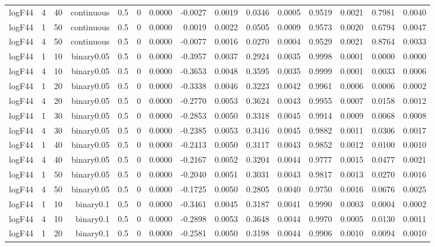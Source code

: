 \begin{longtable}{rrrrrrrrrrrrrrr}
  logF44 & 4 & 40 & continuous & 0.5 & 0 & 0.0000 & -0.0027 & 0.0019 & 0.0346 & 0.0005 & 0.9519 & 0.0021 & 0.7981 & 0.0040 \\ 
  logF44 & 1 & 50 & continuous & 0.5 & 0 & 0.0000 & 0.0019 & 0.0022 & 0.0505 & 0.0009 & 0.9573 & 0.0020 & 0.6794 & 0.0047 \\ 
  logF44 & 4 & 50 & continuous & 0.5 & 0 & 0.0000 & -0.0077 & 0.0016 & 0.0270 & 0.0004 & 0.9529 & 0.0021 & 0.8764 & 0.0033 \\ 
  logF44 & 1 & 10 & binary0.05 & 0.5 & 0 & 0.0000 & -0.3957 & 0.0037 & 0.2924 & 0.0035 & 0.9998 & 0.0001 & 0.0000 & 0.0000 \\ 
  logF44 & 4 & 10 & binary0.05 & 0.5 & 0 & 0.0000 & -0.3653 & 0.0048 & 0.3595 & 0.0035 & 0.9999 & 0.0001 & 0.0033 & 0.0006 \\ 
  logF44 & 1 & 20 & binary0.05 & 0.5 & 0 & 0.0000 & -0.3338 & 0.0046 & 0.3223 & 0.0042 & 0.9961 & 0.0006 & 0.0006 & 0.0002 \\ 
  logF44 & 4 & 20 & binary0.05 & 0.5 & 0 & 0.0000 & -0.2770 & 0.0053 & 0.3624 & 0.0043 & 0.9955 & 0.0007 & 0.0158 & 0.0012 \\ 
  logF44 & 1 & 30 & binary0.05 & 0.5 & 0 & 0.0000 & -0.2853 & 0.0050 & 0.3318 & 0.0045 & 0.9914 & 0.0009 & 0.0068 & 0.0008 \\ 
  logF44 & 4 & 30 & binary0.05 & 0.5 & 0 & 0.0000 & -0.2385 & 0.0053 & 0.3416 & 0.0045 & 0.9882 & 0.0011 & 0.0306 & 0.0017 \\ 
  logF44 & 1 & 40 & binary0.05 & 0.5 & 0 & 0.0000 & -0.2413 & 0.0050 & 0.3117 & 0.0043 & 0.9852 & 0.0012 & 0.0100 & 0.0010 \\ 
  logF44 & 4 & 40 & binary0.05 & 0.5 & 0 & 0.0000 & -0.2167 & 0.0052 & 0.3204 & 0.0044 & 0.9777 & 0.0015 & 0.0477 & 0.0021 \\ 
  logF44 & 1 & 50 & binary0.05 & 0.5 & 0 & 0.0000 & -0.2040 & 0.0051 & 0.3031 & 0.0043 & 0.9817 & 0.0013 & 0.0270 & 0.0016 \\ 
  logF44 & 4 & 50 & binary0.05 & 0.5 & 0 & 0.0000 & -0.1725 & 0.0050 & 0.2805 & 0.0040 & 0.9750 & 0.0016 & 0.0676 & 0.0025 \\ 
  logF44 & 1 & 10 & binary0.1 & 0.5 & 0 & 0.0000 & -0.3461 & 0.0045 & 0.3187 & 0.0041 & 0.9990 & 0.0003 & 0.0004 & 0.0002 \\ 
  logF44 & 4 & 10 & binary0.1 & 0.5 & 0 & 0.0000 & -0.2898 & 0.0053 & 0.3648 & 0.0044 & 0.9970 & 0.0005 & 0.0130 & 0.0011 \\ 
  logF44 & 1 & 20 & binary0.1 & 0.5 & 0 & 0.0000 & -0.2581 & 0.0050 & 0.3198 & 0.0044 & 0.9906 & 0.0010 & 0.0094 & 0.0010 \\ 

\end{longtable}
